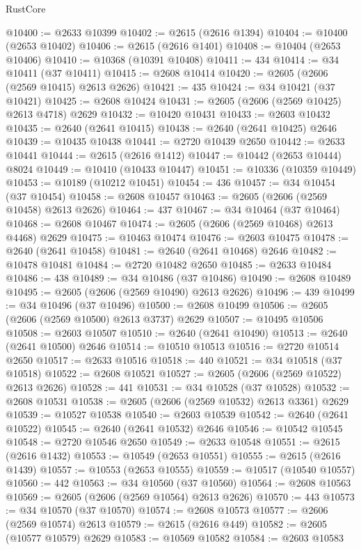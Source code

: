 \begin{lexlean}{RustCore}
\begin{coremodule}
@10400 := @2633 @10399
@10402 := @2615 (@2616 @1394)
@10404 := @10400 (@2653 @10402)
@10406 := @2615 (@2616 @1401)
@10408 := @10404 (@2653 @10406)
@10410 := @10368 (@10391 @10408)
@10411 := 434
@10414 := @34 @10411 (@37 @10411)
@10415 := @2608 @10414
@10420 := @2605 (@2606 (@2569 @10415) @2613 @2626)
@10421 := 435
@10424 := @34 @10421 (@37 @10421)
@10425 := @2608 @10424
@10431 := @2605 (@2606 (@2569 @10425) @2613 @4718) @2629
@10432 := @10420 @10431
@10433 := @2603 @10432
@10435 := @2640 (@2641 @10415)
@10438 := @2640 (@2641 @10425) @2646
@10439 := @10435 @10438
@10441 := @2720 @10439 @2650
@10442 := @2633 @10441
@10444 := @2615 (@2616 @1412)
@10447 := @10442 (@2653 @10444) @8024
@10449 := @10410 (@10433 @10447)
@10451 := @10336 (@10359 @10449)
@10453 := @10189 (@10212 @10451)
@10454 := 436
@10457 := @34 @10454 (@37 @10454)
@10458 := @2608 @10457
@10463 := @2605 (@2606 (@2569 @10458) @2613 @2626)
@10464 := 437
@10467 := @34 @10464 (@37 @10464)
@10468 := @2608 @10467
@10474 := @2605 (@2606 (@2569 @10468) @2613 @4468) @2629
@10475 := @10463 @10474
@10476 := @2603 @10475
@10478 := @2640 (@2641 @10458)
@10481 := @2640 (@2641 @10468) @2646
@10482 := @10478 @10481
@10484 := @2720 @10482 @2650
@10485 := @2633 @10484
@10486 := 438
@10489 := @34 @10486 (@37 @10486)
@10490 := @2608 @10489
@10495 := @2605 (@2606 (@2569 @10490) @2613 @2626)
@10496 := 439
@10499 := @34 @10496 (@37 @10496)
@10500 := @2608 @10499
@10506 := @2605 (@2606 (@2569 @10500) @2613 @3737) @2629
@10507 := @10495 @10506
@10508 := @2603 @10507
@10510 := @2640 (@2641 @10490)
@10513 := @2640 (@2641 @10500) @2646
@10514 := @10510 @10513
@10516 := @2720 @10514 @2650
@10517 := @2633 @10516
@10518 := 440
@10521 := @34 @10518 (@37 @10518)
@10522 := @2608 @10521
@10527 := @2605 (@2606 (@2569 @10522) @2613 @2626)
@10528 := 441
@10531 := @34 @10528 (@37 @10528)
@10532 := @2608 @10531
@10538 := @2605 (@2606 (@2569 @10532) @2613 @3361) @2629
@10539 := @10527 @10538
@10540 := @2603 @10539
@10542 := @2640 (@2641 @10522)
@10545 := @2640 (@2641 @10532) @2646
@10546 := @10542 @10545
@10548 := @2720 @10546 @2650
@10549 := @2633 @10548
@10551 := @2615 (@2616 @1432)
@10553 := @10549 (@2653 @10551)
@10555 := @2615 (@2616 @1439)
@10557 := @10553 (@2653 @10555)
@10559 := @10517 (@10540 @10557)
@10560 := 442
@10563 := @34 @10560 (@37 @10560)
@10564 := @2608 @10563
@10569 := @2605 (@2606 (@2569 @10564) @2613 @2626)
@10570 := 443
@10573 := @34 @10570 (@37 @10570)
@10574 := @2608 @10573
@10577 := @2606 (@2569 @10574) @2613
@10579 := @2615 (@2616 @449)
@10582 := @2605 (@10577 @10579) @2629
@10583 := @10569 @10582
@10584 := @2603 @10583

\end{coremodule}
\end{lexlean}
